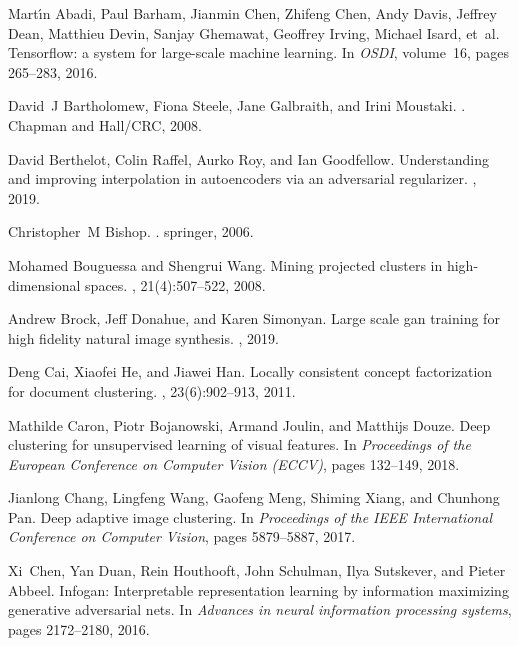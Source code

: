 \documentclass{article}
\begin{document}

\begin{thebibliography}{10}

Mart{\'\i}n Abadi, Paul Barham, Jianmin Chen, Zhifeng Chen, Andy Davis, Jeffrey
  Dean, Matthieu Devin, Sanjay Ghemawat, Geoffrey Irving, Michael Isard, et~al.
\newblock Tensorflow: a system for large-scale machine learning.
\newblock In {\em OSDI}, volume~16, pages 265--283, 2016.

David~J Bartholomew, Fiona Steele, Jane Galbraith, and Irini Moustaki.
.
\newblock Chapman and Hall/CRC, 2008.

David Berthelot, Colin Raffel, Aurko Roy, and Ian Goodfellow.
\newblock Understanding and improving interpolation in autoencoders via an
  adversarial regularizer.
,
  2019.

Christopher~M Bishop.
.
\newblock springer, 2006.

Mohamed Bouguessa and Shengrui Wang.
\newblock Mining projected clusters in high-dimensional spaces.
,
  21(4):507--522, 2008.

Andrew Brock, Jeff Donahue, and Karen Simonyan.
\newblock Large scale gan training for high fidelity natural image synthesis.
,
  2019.

Deng Cai, Xiaofei He, and Jiawei Han.
\newblock Locally consistent concept factorization for document clustering.
,
  23(6):902--913, 2011.

Mathilde Caron, Piotr Bojanowski, Armand Joulin, and Matthijs Douze.
\newblock Deep clustering for unsupervised learning of visual features.
\newblock In {\em Proceedings of the European Conference on Computer Vision
  (ECCV)}, pages 132--149, 2018.

Jianlong Chang, Lingfeng Wang, Gaofeng Meng, Shiming Xiang, and Chunhong Pan.
\newblock Deep adaptive image clustering.
\newblock In {\em Proceedings of the IEEE International Conference on Computer
  Vision}, pages 5879--5887, 2017.

Xi~Chen, Yan Duan, Rein Houthooft, John Schulman, Ilya Sutskever, and Pieter
  Abbeel.
\newblock Infogan: Interpretable representation learning by information
  maximizing generative adversarial nets.
\newblock In {\em Advances in neural information processing systems}, pages
  2172--2180, 2016.


\end{thebibliography}
\end{document}
